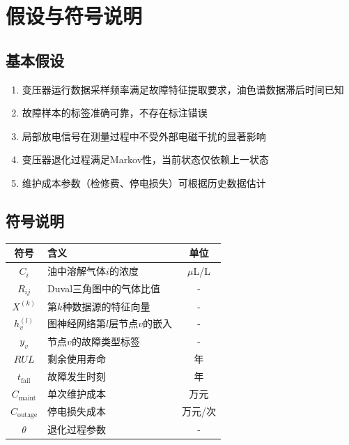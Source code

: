 \newpage
\section{假设与符号说明}

\subsection{基本假设}
\begin{enumerate}
    \item 变压器运行数据采样频率满足故障特征提取要求，油色谱数据滞后时间已知
    \item 故障样本的标签准确可靠，不存在标注错误
    \item 局部放电信号在测量过程中不受外部电磁干扰的显著影响
    \item 变压器退化过程满足Markov性，当前状态仅依赖上一状态
    \item 维护成本参数（检修费、停电损失）可根据历史数据估计
\end{enumerate}

\subsection{符号说明}
\begin{center}
\begin{tabular}{c l c}
\hline
符号 & 含义 & 单位 \\
\hline
$C_i$ & 油中溶解气体$i$的浓度 & $\mu$L/L \\
$R_{ij}$ & Duval三角图中的气体比值 & - \\
$X^{(k)}$ & 第$k$种数据源的特征向量 & - \\
$h_v^{(l)}$ & 图神经网络第$l$层节点$v$的嵌入 & - \\
$y_v$ & 节点$v$的故障类型标签 & - \\
$RUL$ & 剩余使用寿命 & 年 \\
$t_{\text{fail}}$ & 故障发生时刻 & 年 \\
$C_{\text{maint}}$ & 单次维护成本 & 万元 \\
$C_{\text{outage}}$ & 停电损失成本 & 万元/次 \\
$\theta$ & 退化过程参数 & - \\
\hline
\end{tabular}
\end{center}
